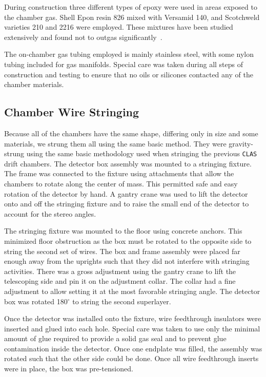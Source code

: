 During construction three different types of epoxy were used in areas exposed 
to the chamber gas.  Shell Epon resin 826 mixed with Versamid 140, and 
Scotchweld varieties 210 and 2216 were employed.  These mixtures have been 
studied extensively and found not to outgas significantly~\cite{nasa}.

The on-chamber gas tubing employed is mainly stainless steel, with some
nylon tubing included for gas manifolds.  Special care was taken during
all steps of construction and testing to ensure that no oils or
silicones contacted any of the chamber materials.

\subsection{Chamber Wire Stringing}


Because all of the chambers have the same shape, differing only in
size and some materials, we strung them all using the same basic method.
They were gravity-strung using the same basic methodology 
used when stringing the previous {\tt CLAS} drift chambers.  The detector box 
assembly was mounted to a stringing fixture.  The frame was connected to 
the fixture using attachments that allow the chambers to rotate along 
the center of mass.  This permitted safe and easy 
rotation of the detector by hand.  A gantry crane was used to lift the 
detector onto and off the stringing fixture and to raise the small end of 
the detector to account for the stereo angles.

The stringing fixture was mounted to the floor using 
concrete anchors.  This minimized floor obstruction as the box must be 
rotated to the opposite side to string the second set of wires.  The box 
and frame assembly were placed far enough away from the uprights such that 
they did not interfere with stringing activities.  There was a gross 
adjustment using 
the gantry crane to lift the telescoping side and pin it on the adjustment 
collar.  The collar had a fine adjustment to allow setting it at the most 
favorable stringing angle.  The detector box was rotated 180$^\circ$ to 
string the second superlayer.

Once the detector was installed onto the fixture, wire feedthrough 
insulators were inserted and glued into each hole. Special care was 
taken to use only the minimal amount of glue required to provide a solid gas 
seal and to prevent glue contamination inside the detector.  Once one 
endplate was filled, the assembly was rotated such that the other side 
could be done.  Once all wire feedthrough inserts were in place, the box 
was pre-tensioned.

